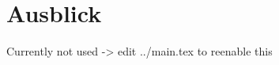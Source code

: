 \section{Ausblick}\label{ausblick}

Currently not used -\textgreater{} edit ../main.tex to reenable this
